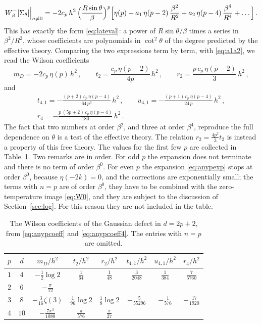 \documentclass[a4paper,11pt]{article}
\begin{document}
	\begin{equation}\label{eq:anypexp}
		W^-_\beta[\Sigma_\theta]\Big|_{n\neq0}=-2c_p\,h^2\,\Bigl(\frac{R\sin\theta}{\beta}\Bigr)^{p}\Bigl[\eta(p)+a_1\,\eta(p-2)\,\frac{\beta^2}{R^2}+a_2\,\eta(p-4)\,\frac{\beta^4}{R^4}+\dots\Bigr]\, .
	\end{equation}
	This has exactly the form \eqref{eq:lateval}: a power of $R\sin\theta/\beta$ times a series in $\beta^2/R^2$, whose coefficients are polynomials in $\cot^2\theta$ of the degree predicted by the effective theory. Comparing the two expressions term by term, with \eqref{eq:a1a2}, we read the Wilson coefficients
	\begin{equation}\label{eq:anypcoeff}
		m_D=-2c_p\,\eta(p)\,h^2\, ,\qquad t_2=\frac{c_p\,\eta(p-2)}{4p}\,h^2\, ,\qquad r_2=\frac{p\,c_p\,\eta(p-2)}{3}\,h^2\, ,
	\end{equation}
	and
	\begin{equation}\label{eq:anypcoeff4}
		\begin{gathered}
			t_{4,1}=-\frac{(p+2)\,c_p\,\eta(p-4)}{64\,p^3}\,h^2\, ,\qquad
			u_{4,1}=-\frac{(p+1)\,c_p\,\eta(p-4)}{24\,p}\,h^2\, ,\\
			r_4=-\frac{p\,(5p+2)\,c_p\,\eta(p-4)}{180}\,h^2\, .
		\end{gathered}
	\end{equation}
	The fact that two numbers at order $\beta^2$, and three at order $\beta^4$, reproduce the full dependence on $\theta$ is a test of the effective theory. The relation $r_2=\tfrac{4p^2}{3}t_2$ is instead a property of this free theory. The values for the first few $p$ are collected in Table~\ref{tab:gauss}. Two remarks are in order. For odd $p$ the expansion does not terminate and there is no term of order $\beta^0$. For even $p$ the expansion \eqref{eq:anypexp} stops at order $\beta^0$, because $\eta(-2k)=0$, and the corrections are exponentially small; the terms with $n=p$ are of order $\beta^0$, they have to be combined with the zero-temperature image \eqref{eq:W0}, and they are subject to the discussion of Section~\ref{sec:log}. For this reason they are not included in the table.
	\begin{table}[!htb]
		\centering
		\begin{tabular}{cccccccc}
			\toprule
			$p$ & $d$ & $m_D/h^2$ & $t_2/h^2$ & $r_2/h^2$ & $t_{4,1}/h^2$ & $u_{4,1}/h^2$ & $r_4/h^2$\\
			\midrule
			$1$ & $4$ & $-\tfrac12\log2$ & $\tfrac{1}{64}$ & $\tfrac{1}{48}$ & $\tfrac{3}{2048}$ & $\tfrac{1}{384}$ & $\tfrac{7}{5760}$\\[3pt]
			$2$ & $6$ & $-\tfrac{\pi}{12}$ & & & & & \\[3pt]
			$3$ & $8$ & $-\tfrac{3}{16}\zeta(3)$ & $\tfrac{1}{96}\log2$ & $\tfrac18\log2$ & $-\tfrac{5}{55296}$ & $-\tfrac{1}{576}$ & $-\tfrac{17}{1920}$\\[3pt]
			$4$ & $10$ & $-\tfrac{7\pi^3}{1080}$ & $\tfrac{\pi}{576}$ & $\tfrac{\pi}{27}$ & & & \\
			\bottomrule
		\end{tabular}
		\caption{The Wilson coefficients of the Gaussian defect in $d=2p+2$, from \eqref{eq:anypcoeff} and \eqref{eq:anypcoeff4}. The entries with $n=p$ are omitted.}
		\label{tab:gauss}
	\end{table}
	
\end{document}
